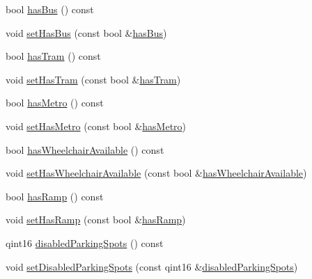 \begin{DoxyCompactItemize}
\item 
bool \mbox{\hyperlink{classQRail_1_1StationEngine_1_1Station_ab373623fb7c16bd0e4de09a2c8ab3fed}{has\+Bus}} () const
\item 
void \mbox{\hyperlink{classQRail_1_1StationEngine_1_1Station_a21d3d32a85308ceecfa4588fab2d50d0}{set\+Has\+Bus}} (const bool \&\mbox{\hyperlink{classQRail_1_1StationEngine_1_1Station_ab373623fb7c16bd0e4de09a2c8ab3fed}{has\+Bus}})
\item 
bool \mbox{\hyperlink{classQRail_1_1StationEngine_1_1Station_a18cc82bbb307cdc0f1ef6db28a664fe5}{has\+Tram}} () const
\item 
void \mbox{\hyperlink{classQRail_1_1StationEngine_1_1Station_ac60188d8fd67689dbda07bd24391ea65}{set\+Has\+Tram}} (const bool \&\mbox{\hyperlink{classQRail_1_1StationEngine_1_1Station_a18cc82bbb307cdc0f1ef6db28a664fe5}{has\+Tram}})
\item 
bool \mbox{\hyperlink{classQRail_1_1StationEngine_1_1Station_ae3bfe0ae7f6c042e199c0d5a6e2dd669}{has\+Metro}} () const
\item 
void \mbox{\hyperlink{classQRail_1_1StationEngine_1_1Station_a108681c01bd97529f10fc19c40122910}{set\+Has\+Metro}} (const bool \&\mbox{\hyperlink{classQRail_1_1StationEngine_1_1Station_ae3bfe0ae7f6c042e199c0d5a6e2dd669}{has\+Metro}})
\item 
bool \mbox{\hyperlink{classQRail_1_1StationEngine_1_1Station_a5f199ba2479501715c96d41ce27bc4c8}{has\+Wheelchair\+Available}} () const
\item 
void \mbox{\hyperlink{classQRail_1_1StationEngine_1_1Station_a6cd5dbb113aedfd7fe6e46fdedb26e9b}{set\+Has\+Wheelchair\+Available}} (const bool \&\mbox{\hyperlink{classQRail_1_1StationEngine_1_1Station_a5f199ba2479501715c96d41ce27bc4c8}{has\+Wheelchair\+Available}})
\item 
bool \mbox{\hyperlink{classQRail_1_1StationEngine_1_1Station_a477fb013f192d1f7c0e6858008e42c0a}{has\+Ramp}} () const
\item 
void \mbox{\hyperlink{classQRail_1_1StationEngine_1_1Station_a4a5bd6731d4f53284f92f4eb0487944f}{set\+Has\+Ramp}} (const bool \&\mbox{\hyperlink{classQRail_1_1StationEngine_1_1Station_a477fb013f192d1f7c0e6858008e42c0a}{has\+Ramp}})
\item 
qint16 \mbox{\hyperlink{classQRail_1_1StationEngine_1_1Station_a462fa31e61a725a498055b3fcba8cce5}{disabled\+Parking\+Spots}} () const
\item 
void \mbox{\hyperlink{classQRail_1_1StationEngine_1_1Station_a2b3e193aee01e6379e8f91b27172f391}{set\+Disabled\+Parking\+Spots}} (const qint16 \&\mbox{\hyperlink{classQRail_1_1StationEngine_1_1Station_a462fa31e61a725a498055b3fcba8cce5}{disabled\+Parking\+Spots}})

\end{DoxyCompactItemize}
